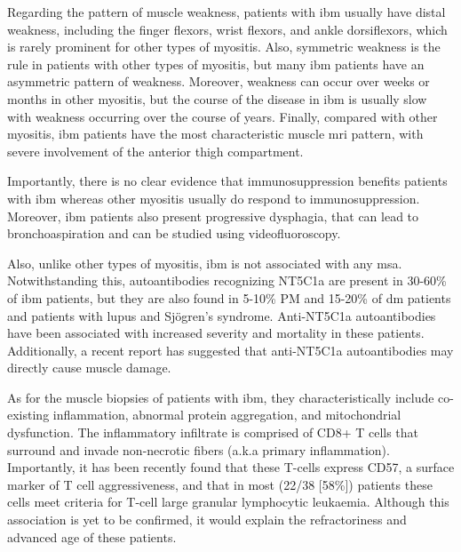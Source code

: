 Regarding the pattern of muscle weakness, patients with \gls{ibm} usually have distal weakness, including the finger flexors, wrist flexors, and ankle dorsiflexors, which is rarely prominent for other types of myositis.\cite{Lloyd2014,SelvaOCallaghan2018} Also, symmetric weakness is the rule in patients with other types of myositis, but many \gls{ibm} patients have an asymmetric pattern of weakness.\cite{SelvaOCallaghan2018} Moreover, weakness can occur over weeks or months in other myositis, but the course of the disease in \gls{ibm} is usually slow with weakness occurring over the course of years.\cite{SelvaOCallaghan2018} Finally, compared with other myositis, \gls{ibm} patients have the most characteristic muscle \gls{mri} pattern, with severe involvement of the anterior thigh compartment.\cite{Tasca2015,PinalFernandez2017}

Importantly, there is no clear evidence that immunosuppression benefits patients with \gls{ibm} whereas other myositis usually do respond to immunosuppression.\cite{SelvaOCallaghan2018} Moreover, \gls{ibm} patients also present progressive dysphagia,\cite{SelvaOCallaghan2018} that can lead to bronchoaspiration and can be studied using videofluoroscopy. 

Also, unlike other types of myositis, \gls{ibm} is not associated with any \gls{msa}. Notwithstanding this, autoantibodies recognizing NT5C1a are present in 30-60\% of \gls{ibm} patients, but they are also found in 5-10\% PM and 15-20\% of \gls{dm} patients and patients with lupus and Sjögren's syndrome.\cite{Lloyd2016,Herbert2016,Muro2017,Lilleker2017} Anti-NT5C1a autoantibodies have been associated with increased severity and mortality in these patients.\cite{Lilleker2017,Goyal2016} Additionally, a recent report has suggested that anti-NT5C1a autoantibodies may directly cause muscle damage.\cite{Tawara2017}

As for the muscle biopsies of patients with \gls{ibm}, they characteristically include co-existing inflammation, abnormal protein aggregation, and mitochondrial dysfunction.\cite{Dalakas2002} The inflammatory infiltrate is comprised of CD8+ T cells that surround and invade non-necrotic fibers (a.k.a primary inflammation). Importantly, it has been recently found that these T-cells express CD57, a surface marker of T cell aggressiveness, and that in most (22/38 [58\%]) patients these cells meet criteria for T-cell large granular lymphocytic leukaemia.\cite{Greenberg2016} Although this association is yet to be confirmed, it would explain the refractoriness and advanced age of these patients.\cite{Greenberg2016}

